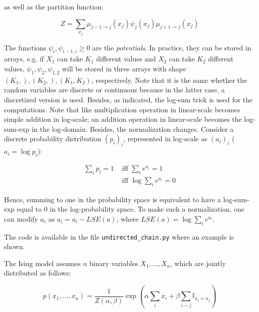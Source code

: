 \documentclass[a4paper, 11pt]{report}
\begin{document}
\begin{enumerate}
    as well as the partition function:
    
    \begin{equation*}
        Z = \sum_{x_j} \mu_{j-1 \rightarrow j} \left( x_j \right) \psi_j \left( x_j \right) \mu_{j+1 \rightarrow j} \left( x_j \right) 
    \end{equation*}
    
    The functions $\psi_i, \psi_{i-1, i} \geq 0$ are the \emph{potentials}. In practice, they can be stored in arrays, e.g. if $X_1$ can take $K_1$ different values and $X_2$ can take $K_2$ different values, $\psi_1, \psi_2, \psi_{1, 2}$ will be stored in three arrays with shape $\left(K_1,\right), \left(K_2,\right), \left(K_1, K_2\right)$, respectively. Note that it is the same whether the random variables are discrete or continuous because in the latter case, a discretized version is used. Besides, as indicated, the log-sum trick is used for the computations. Note that like multiplication operation in linear-scale becomes simple addition in log-scale; an addition operation in linear-scale becomes the log-sum-exp in the log-domain. Besides, the normalization changes. Consider a discrete probability distribution $\left( p_i \right)_i$, represented in log-scale as $\left( a_i \right)_i$ (\ie $a_i = \log p_i$):
    
    \begin{equation*}
        \begin{aligned}
        \sum_i p_i = 1 &\text{ iff } \sum_i e^{a_i} = 1 \\
        &\text{ iff } \log \sum_i e^{a_i} = 0
        \end{aligned}
    \end{equation*}
    
    Hence, summing to one in the probability space is equivalent to have a log-sum-exp equal to $0$ in the log-probability space. To make such a normalization, one can modify $a_i$ as $a_i = a_i - LSE(a)$, where $LSE(a) = \log \sum_i e^{a_i}$.
    
    The code is available in the file \texttt{undirected\_chain.py} where an example is shown. \\
\end{enumerate}

The Ising model assumes $n$ binary variables $X_1, \dots, X_n$, which are jointly distributed as follows:

\begin{equation*}
    p \left( x_1, \dots, x_n \right) = \frac{1}{Z \left( \alpha, \beta \right)} \exp \left( \alpha \sum_{i} x_i + \beta \sum_{i \sim j} \mathbb{I}_{x_i = x_j} \right)
\end{equation*}
\end{document}
